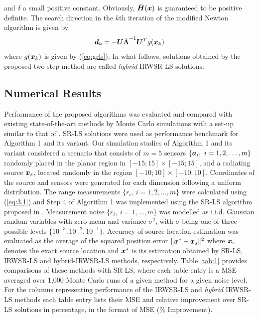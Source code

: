 and $\delta$ a small positive constant. Obviously, $\tilde{\mbox{\boldmath$H$}}(\mbox{\boldmath$x$})$ is guaranteed to be positive definite. The search direction in the $k$th iteration of the modified Newton algorithm is given by 
\begin{equation}
\nonumber
\mbox{\boldmath$d$}_k = - \mbox{\boldmath$U$}\tilde{\mbox{\boldmath{$\Lambda$}}}^{-1}\mbox{\boldmath$U$}^T g(\mbox{\boldmath$x$}_k)
\end{equation}
where $g(\mbox{\boldmath$x$}_k)$ is given by (\ref{eq:grls}). In what follows, solutions obtained by the proposed two-step method are called \textit{hybrid} IRWSR-LS solutions.

\subsection{Numerical Results}


Performance of the proposed algorithms was evaluated and compared with existing state-of-the-art methods by Monte Carlo simulations with a set-up similar to that of \cite{BeckStLi}. SR-LS solutions were used as performance benchmark for Algorithm 1 and its variant. Our simulation studies of Algorithm 1 and its variant considered a scenario that consists of %
 $m = 5$ sensors $\{\mbox{\boldmath$a$}_i, \ i=1, 2,\ldots,m\}$ randomly placed in the planar region in $[-15;15]\times[-15;15]$,
 and a radiating source $\mbox{\boldmath$x$}_s$, located randomly in the region $[-10;10]\times[-10;10]$. Coordinates of the source and sensors were generated for each dimension following a uniform distribution. The range measurements $\{r_i, \ i=1, 2,\ldots, m\}$ were calculated using (\ref{eq:3.1}) and Step 4 of Algorithm 1 was implemented using the SR-LS algorithm proposed in \cite{BeckStLi}. Measurement noise $\{\varepsilon_i, \ i=1,\ldots, m\}$ was modelled as i.i.d. Gaussian random variables with zero mean and variance $\sigma^2$, with $\sigma$ being one of three possible levels $\{10^{-3}, 10^{-2}, 10^{-1}\}$. Accuracy of source location estimation was evaluated as the average of the squared position error $\|\mbox{\boldmath$x$}^* - \mbox{\boldmath$x$}_s\|^2$ where $\mbox{\boldmath$x$}_s$ denotes the exact source location and $\mbox{\boldmath$x$}^*$ is its estimation obtained by SR-LS, IRWSR-LS and hybrid-IRWSR-LS methods, respectively. Table \ref{tab:1} provides comparisons of these methods with SR-LS, where each table entry is a MSE averaged over 1,000 Monte Carlo runs of a given method for a given noise level. For the columns representing performance of the IRWSR-LS and \textit{hybrid} IRWSR-LS methods each table entry lists their MSE and relative improvement over SR-LS solutions in percentage, in the format of MSE ($\%$ Improvement). 

